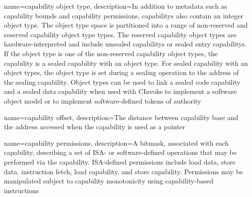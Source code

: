 {
  name=capability object type,
  description={In addition to  metadata such
    as \gls{capability bounds} and \gls{capability permissions}, \glspl{capability} also contain an integer object type.
    The object type space is partitioned into a range of non-reserved and
    \gls{reserved capability object type} types.
    The \glspl{reserved capability object type} are hardware-interpreted and
    include \glspl{unsealed capability} or \glspl{sealed entry capability}.
    If the object type is one of the non-\glspl{reserved capability object type},
    the capability is a \gls{sealed capability with an object type}.
    For \glspl{sealed capability with an object type}, the object type is set during a
    sealing operation to the \gls{address} of the \gls{sealing capability}.
    Object types can be used to link a sealed \gls{code capability} and a
    sealed \gls{data capability} when used with \gls{CInvoke} to implement a
    software object model or to implement software-defined tokens of authority}
}

{
  name=capability offset,
  description={The distance between \gls{capability base} and the
    \gls{address} accessed when the \gls{capability} is used as a \gls{pointer}}
}

{
  name=capability permissions,
  description={A bitmask, associated with each \gls{capability},
    describing a set of ISA- or software-defined operations that may be
    performed via the capability.
    ISA-defined permissions include load data, store data, instruction fetch,
    load capability, and store capability.
    Permissions may be manipulated subject to \gls{capability monotonicity}
    using \gls{capability-based instructions}}
}

